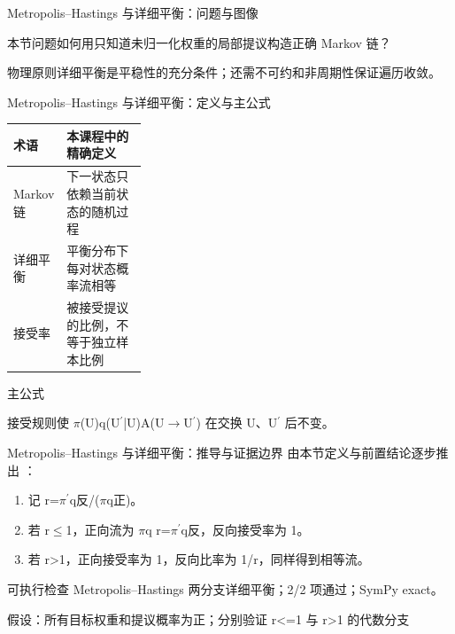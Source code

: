 \begin{frame}[t]{Metropolis--Hastings 与详细平衡：问题与图像}
\footnotesize
\begin{block}{本节问题}如何用只知道未归一化权重的局部提议构造正确 Markov 链？\end{block}
\begin{block}{物理原则}\quad 详细平衡是平稳性的充分条件；还需不可约和非周期性保证遍历收敛。\end{block}
\end{frame}

\begin{frame}[t]{Metropolis--Hastings 与详细平衡：定义与主公式}
\footnotesize\begin{tabularx}{\linewidth}{p{0.30\linewidth}Y}
\toprule 术语 & 本课程中的精确定义\\\midrule
{} Markov 链 & 下一状态只依赖当前状态的随机过程\\
 详细平衡 & 平衡分布下每对状态概率流相等\\
 接受率 & 被接受提议的比例，不等于独立样本比例\\
\bottomrule\end{tabularx}\vspace{0.15cm}
\begin{block}{ 主公式}\centering{}\end{block}
接受规则使 \ensuremath{\pi}(U)q(U\ensuremath{^{\prime}}|U)A(U\ensuremath{\rightarrow}U\ensuremath{^{\prime}}) 在交换 U、U\ensuremath{^{\prime}} 后不变。
\end{frame}

\begin{frame}[t]{Metropolis--Hastings 与详细平衡：推导与证据边界}
\footnotesize
{}\quad 由本节定义与前置结论逐步推出 ：
\begin{enumerate}
\item 记 r=\ensuremath{\pi}\ensuremath{^{\prime}}q反/\allowbreak{}(\ensuremath{\pi}q正)。
\item 若 r\ensuremath{\le}1，正向流为 \ensuremath{\pi}q r=\ensuremath{\pi}\ensuremath{^{\prime}}q反，反向接受率为 1。
\item 若 r>1，正向接受率为 1，反向比率为 1/\allowbreak{}r，同样得到相等流。
\end{enumerate}\begin{block}{可执行检查}
\quad Metropolis--Hastings 两分支详细平衡；2/2 项通过；SymPy exact。
\par\scriptsize 假设：所有目标权重和提议概率为正；分别验证 r<=1 与 r>1 的代数分支
\end{block}
\end{frame}

